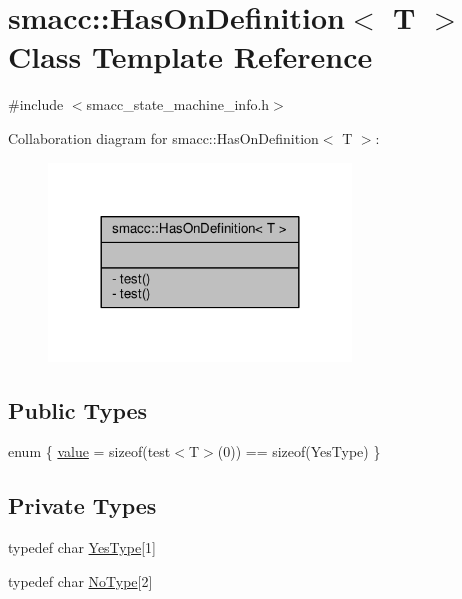\hypertarget{classsmacc_1_1HasOnDefinition}{}\section{smacc\+:\+:Has\+On\+Definition$<$ T $>$ Class Template Reference}
\label{classsmacc_1_1HasOnDefinition}


{\ttfamily \#include $<$smacc\+\_\+state\+\_\+machine\+\_\+info.\+h$>$}



Collaboration diagram for smacc\+:\+:Has\+On\+Definition$<$ T $>$\+:
\nopagebreak
\begin{figure}[H]
\begin{center}
\leavevmode
\includegraphics[width=228pt]{classsmacc_1_1HasOnDefinition__coll__graph}
\end{center}
\end{figure}
\subsection*{Public Types}
\begin{DoxyCompactItemize}
\item 
enum \{ \hyperlink{classsmacc_1_1HasOnDefinition_a42ed2a75557706765cc75f0454d612dba0ee3bd0e07973c128ab64f02600c7720}{value} = sizeof(test$<$T$>$(0)) == sizeof(Yes\+Type)
 \}
\end{DoxyCompactItemize}
\subsection*{Private Types}
\begin{DoxyCompactItemize}
\item 
typedef char \hyperlink{classsmacc_1_1HasOnDefinition_af147416543b9d5a19d3dfc4f3f0d42a6}{Yes\+Type}\mbox{[}1\mbox{]}
\item 
typedef char \hyperlink{classsmacc_1_1HasOnDefinition_ab424fbc32a091d6271cabe47eb0725ca}{No\+Type}\mbox{[}2\mbox{]}
\end{DoxyCompactItemize}
